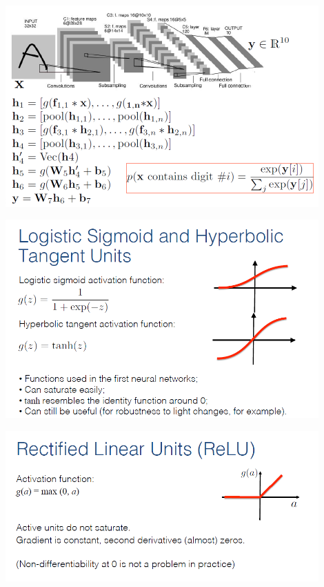 \documentclass{beamer}
\begin{document}
\begin{frame}
\includegraphics[width=0.9\textwidth]{images/archi_1.PNG} 
\end{frame}
\begin{frame}
\includegraphics[width=0.9\textwidth]{images/archi_2.PNG} 
\end{frame}
\begin{frame}
\includegraphics[width=0.9\textwidth]{images/archi_3.PNG} 
\end{frame}
\end{document}
